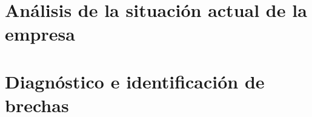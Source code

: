
\section{Análisis de la situación actual de la empresa}



\section{Diagnóstico e identificación de brechas}
